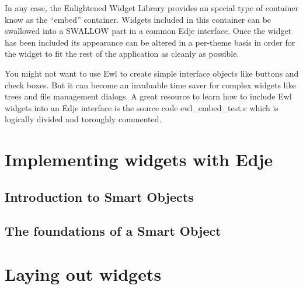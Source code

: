 \documentclass[12pt,a4paper,english]{book}
\begin{document}
In any case, the Enlightened Widget Library provides an special type of
container know as the ``embed'' container. Widgets included in this container can
be swallowed into a SWALLOW part in a common Edje interface. Once the widget
has been included its appearance can be altered in a per-theme basis in order
for the widget to fit the rest of the application as cleanly as possible.

You might not want to use Ewl to create simple interface objects like buttons
and check boxes. But it can become an invaluable time saver for complex widgets
like trees and file management dialogs. A great resource to learn how to
include Ewl widgets into an Edje interface is the source code ewl{\_}embed{\_}test.c
which is logically divided and toroughly commented.



\hypertarget{implementing-widgets-with-edje}{}
\section{Implementing widgets with Edje}



\hypertarget{introduction-to-smart-objects}{}
\subsection{Introduction to Smart Objects}



\hypertarget{the-foundations-of-a-smart-object}{}
\subsection{The foundations of a Smart Object}



\hypertarget{laying-out-widgets}{}
\section{Laying out widgets}



\hypertarget{creating-list-based-widgets}{}
\end{document}
